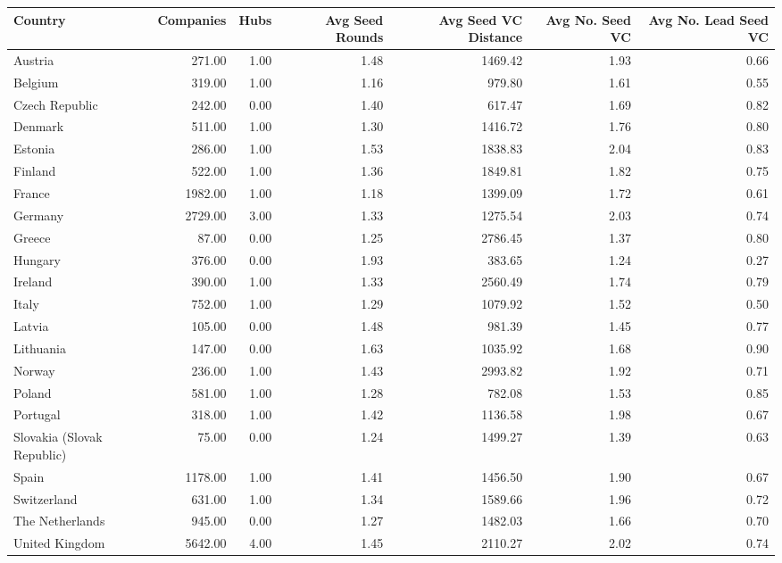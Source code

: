\begin{tabular}{lrrrrrr}
  \toprule
Country & Companies & Hubs & Avg Seed Rounds & Avg Seed VC Distance & Avg No. Seed VC & Avg No. Lead Seed VC \\ 
  \midrule
Austria & 271.00 & 1.00 & 1.48 & 1469.42 & 1.93 & 0.66 \\ 
  Belgium & 319.00 & 1.00 & 1.16 & 979.80 & 1.61 & 0.55 \\ 
  Czech Republic & 242.00 & 0.00 & 1.40 & 617.47 & 1.69 & 0.82 \\ 
  Denmark & 511.00 & 1.00 & 1.30 & 1416.72 & 1.76 & 0.80 \\ 
  Estonia & 286.00 & 1.00 & 1.53 & 1838.83 & 2.04 & 0.83 \\ 
  Finland & 522.00 & 1.00 & 1.36 & 1849.81 & 1.82 & 0.75 \\ 
  France & 1982.00 & 1.00 & 1.18 & 1399.09 & 1.72 & 0.61 \\ 
  Germany & 2729.00 & 3.00 & 1.33 & 1275.54 & 2.03 & 0.74 \\ 
  Greece & 87.00 & 0.00 & 1.25 & 2786.45 & 1.37 & 0.80 \\ 
  Hungary & 376.00 & 0.00 & 1.93 & 383.65 & 1.24 & 0.27 \\ 
  Ireland & 390.00 & 1.00 & 1.33 & 2560.49 & 1.74 & 0.79 \\ 
  Italy & 752.00 & 1.00 & 1.29 & 1079.92 & 1.52 & 0.50 \\ 
  Latvia & 105.00 & 0.00 & 1.48 & 981.39 & 1.45 & 0.77 \\ 
  Lithuania & 147.00 & 0.00 & 1.63 & 1035.92 & 1.68 & 0.90 \\ 
  Norway & 236.00 & 1.00 & 1.43 & 2993.82 & 1.92 & 0.71 \\ 
  Poland & 581.00 & 1.00 & 1.28 & 782.08 & 1.53 & 0.85 \\ 
  Portugal & 318.00 & 1.00 & 1.42 & 1136.58 & 1.98 & 0.67 \\ 
  Slovakia (Slovak Republic) & 75.00 & 0.00 & 1.24 & 1499.27 & 1.39 & 0.63 \\ 
  Spain & 1178.00 & 1.00 & 1.41 & 1456.50 & 1.90 & 0.67 \\ 
  Switzerland & 631.00 & 1.00 & 1.34 & 1589.66 & 1.96 & 0.72 \\ 
  The Netherlands & 945.00 & 0.00 & 1.27 & 1482.03 & 1.66 & 0.70 \\ 
  United Kingdom & 5642.00 & 4.00 & 1.45 & 2110.27 & 2.02 & 0.74 \\ 
   \bottomrule
\end{tabular}
